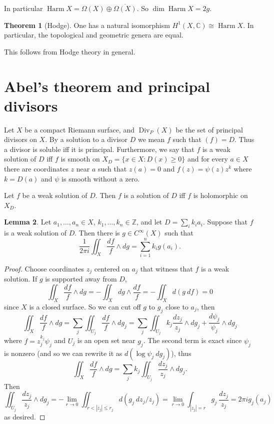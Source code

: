 \documentclass[12pt]{book}
\newcommand{\ZZ}{\mathbb{Z}}
\newcommand{\CC}{\mathbb{C}}
\DeclareMathOperator{\Div}{Div}
\DeclareMathOperator{\Harm}{Harm}
\theoremstyle{definition}
\newtheorem{theorem}{Theorem}[chapter]
\newtheorem{lemma}[theorem]{Lemma}
\begin{document}
In particular $\Harm X = \Omega(X) \oplus \overline{\Omega(X)}$.
So $\dim \Harm X = 2g$.

\begin{theorem}[Hodge]
One has a natural isomorphism $H^1(X, \CC) \cong \Harm X$.
In particular, the topological and geometric genera are equal.
\end{theorem}

This follows from Hodge theory in general.

\section{Abel's theorem and principal divisors}
Let $X$ be a compact Riemann surface, and $\Div_P(X)$ be the set of principal divisors on $X.$
By a solution to a divisor $D$ we mean $f$ such that $(f) = D$.
Thus a divisor is soluble iff it is principal.
Furthermore, we say that $f$ is a weak solution of $D$ iff $f$ is smooth on $X_D = \{x \in X: D(x) \geq 0\}$ and for every $a \in X$ there are coordinates $z$ near $a$ such that $z(a) = 0$ and $f(z) = \psi(z) z^k$ where $k = D(a)$ and $\psi$ is smooth without a zero.

Let $f$ be a weak solution of $D$. Then $f$ is a solution of $D$ iff $f$ is holomorphic on $X_D$.

\begin{lemma}
Let $a_1, \dots, a_n \in X$, $k_1, \dots, k_n \in \ZZ$, and let $D = \sum_i k_i a_i$.
Suppose that $f$ is a weak solution of $D$. Then there is $g \in C^\infty(X)$ such that
$$\frac{1}{2\pi i} \iint_X \frac{df}{f} \wedge dg = \sum_{i=1}^n k_i g(a_i).$$
\end{lemma}
\begin{proof}
Choose coordinates $z_j$ centered on $a_j$ that witness that $f$ is a weak solution. If $g$ is supported away from $D$,
$$\iint_X \frac{df}{f} \wedge dg = - \iint_X dg \wedge \frac{df}{f} = - \iint_X d(g ~df) = 0$$
since $X$ is a closed surface.
So we can cut off $g$ to $g_j$ close to $a_j$, then
$$\iint_X \frac{df}{f} \wedge dg = \sum_j \iint_{U_j} \frac{df}{f} \wedge dg_j = \sum_j \iint_{U_j} k_j \frac{dz_j}{z_j} \wedge dg_j + \frac{d\psi_j}{\psi_j} \wedge dg_j$$
where $f = z_j^{k_j} \psi_j$ and $U_j$ is an open set near $g_j$.
The second term is exact since $\psi_j$ is nonzero (and so we can rewrite it as $d(\log \psi_j ~dg_j)$), thus
$$\iint_X \frac{df}{f} \wedge dg = \sum_j k_j \iint_{U_j} \frac{dz_j}{z_j} \wedge dg_j.$$
Then
$$\iint_{U_j} \frac{dz_j}{z_j} \wedge dg_j = -\lim_{r \to 0} \iint_{r < |z_j| \leq r_j} d(g_j ~dz_j/z_j) = \lim_{r \to 0} \int_{|z_j| = r} g_j ~\frac{dz_j}{z_j} = 2\pi i g_j(a_j)$$
as desired.
\end{proof}
\end{document}
